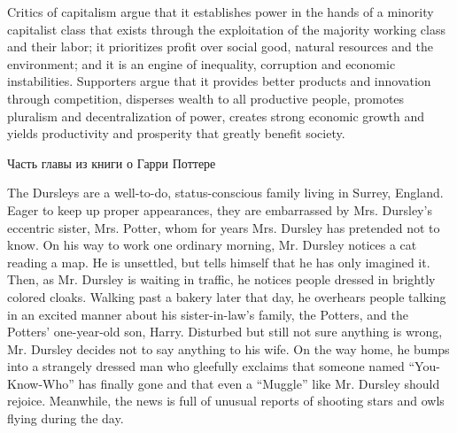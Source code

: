 Critics of capitalism argue that it establishes power in the hands of a minority capitalist class that exists through the exploitation of the majority working class and their labor; it prioritizes profit over social good, natural resources and the environment; and it is an engine of inequality, corruption and economic instabilities. Supporters argue that it provides better products and innovation through competition, disperses wealth to all productive people, promotes pluralism and decentralization of power, creates strong economic growth and yields productivity and prosperity that greatly benefit society.


\thispagestyle{empty}
\newpage

\begin{flushright}
{} 
\end{flushright}
\begin{center}
Часть главы из книги о Гарри Поттере
\end{center}

The Dursleys are a well-to-do, status-conscious family living in Surrey, England. Eager to keep up proper appearances, they are embarrassed by Mrs. Dursley’s eccentric sister, Mrs. Potter, whom for years Mrs. Dursley has pretended not to know. On his way to work one ordinary morning, Mr. Dursley notices a cat reading a map. He is unsettled, but tells himself that he has only imagined it. Then, as Mr. Dursley is waiting in traffic, he notices people dressed in brightly colored cloaks. Walking past a bakery later that day, he overhears people talking in an excited manner about his sister-in-law’s family, the Potters, and the Potters’ one-year-old son, Harry. Disturbed but still not sure anything is wrong, Mr. Dursley decides not to say anything to his wife. On the way home, he bumps into a strangely dressed man who gleefully exclaims that someone named “You-Know-Who” has finally gone and that even a “Muggle” like Mr. Dursley should rejoice. Meanwhile, the news is full of unusual reports of shooting stars and owls flying during the day.

